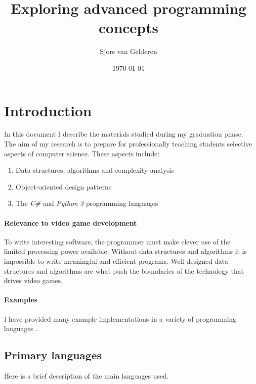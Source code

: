 \documentclass{article}
\author{Sjors van Gelderen}
\title{Exploring advanced programming concepts}
\date{\today{}}
\begin{document}
\maketitle{}


\newpage


\tableofcontents{}


\newpage


\section{Introduction}
In this document I describe the materials studied during my graduation phase. The aim of my research is to prepare
for professionally teaching students selective aspects of computer science. These aspects include:
\begin{enumerate}
\item{Data structures, algorithms and complexity analysis}
\item{Object-oriented design patterns}
\item{The {\em C\#} and {\em Python 3} programming languages}
\end{enumerate}

\paragraph{Relevance to video game development}
To write interesting software, the programmer must make clever use of the limited processing power available. Without data
structures and algorithms it is impossible to write meaningful and efficient programs. Well-designed data structures and
algorithms are what push the boundaries of the technology that drives video games.

\paragraph{Examples}
I have provided many example implementations in a variety of programming languages \cite{repo}.




\subsection{Primary languages}
Here is a brief description of the main languages used.
\end{document}
